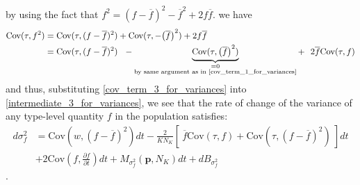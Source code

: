 by using the fact that $f^2 = (f-\overline{f})^2 - \overline{f}^2 + 2f\overline{f}$. we have
\begin{align}
\textrm{Cov}(\tau, f^2) &= \textrm{Cov}(\tau, (f-\overline{f})^2) + \textrm{Cov}(\tau, - {\left(\overline{f}\right)}^2) + 2f\overline{f}\nonumber\\
&=  \textrm{Cov}(\tau, (f-\overline{f})^2) \ \  - \underbrace{\textrm{Cov}(\tau, {\left(\overline{f}\right)}^2)}_{\substack{ =0 \\ {\text{by same argument as in \eqref{cov_term_1_for_variances}}}}} + \ \  2\overline{f}\textrm{Cov}(\tau, f)\label{cov_term_3_for_variances}
\end{align}
and thus, substituting \eqref{cov_term_3_for_variances} into \eqref{intermediate_3_for_variances},  we see that the rate of change of the variance of any type-level quantity $f$ in the population satisfies:
\begin{equation}
\label{stochastic_Price_variance}
\begin{aligned}
d\sigma^2_{f} &= \textrm{Cov}\left(w,(f - \overline{f})^2\right)dt - \frac{2}{KN_K}\left[ \ \overline{f}\textrm{Cov}(\tau, f) +  \textrm{Cov}\left(\tau,(f - \overline{f})^2\right) \ \right]dt\\[12pt]
& + 2\textrm{Cov}\left(f,\frac{\partial f}{\partial t}\right)dt + M_{\sigma^2_f}(\mathbf{p},N_K)dt + dB_{\sigma^2_{f}}
\end{aligned}
\end{equation}.